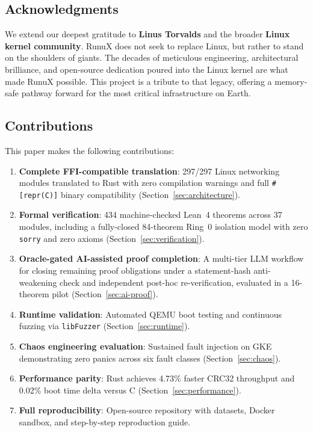 \documentclass[sigconf,nonacm=false]{acmart}
\begin{document}
\subsection{Acknowledgments}
We extend our deepest gratitude to \textbf{Linus Torvalds} and the broader \textbf{Linux kernel community}. RunuX does not seek to replace Linux, but rather to stand on the shoulders of giants. The decades of meticulous engineering, architectural brilliance, and open-source dedication poured into the Linux kernel are what made RunuX possible. This project is a tribute to that legacy, offering a memory-safe pathway forward for the most critical infrastructure on Earth.

\subsection{Contributions}
This paper makes the following contributions:
\begin{enumerate}
    \item \textbf{Complete FFI-compatible translation}: 297/297 Linux networking modules translated to Rust with zero compilation warnings and full \texttt{\#[repr(C)]} binary compatibility (Section~\ref{sec:architecture}).
    \item \textbf{Formal verification}: 434 machine-checked Lean~4 theorems across 37 modules, including a fully-closed 84-theorem Ring~0 isolation model with zero \texttt{sorry} and zero axioms (Section~\ref{sec:verification}).
    \item \textbf{Oracle-gated AI-assisted proof completion}: A multi-tier LLM workflow for closing remaining proof obligations under a statement-hash anti-weakening check and independent post-hoc re-verification, evaluated in a 16-theorem pilot (Section~\ref{sec:ai-proof}).
    \item \textbf{Runtime validation}: Automated QEMU boot testing and continuous fuzzing via \texttt{libFuzzer} (Section~\ref{sec:runtime}).
    \item \textbf{Chaos engineering evaluation}: Sustained fault injection on GKE demonstrating zero panics across six fault classes (Section~\ref{sec:chaos}).
    \item \textbf{Performance parity}: Rust achieves 4.73\% faster CRC32 throughput and 0.02\% boot time delta versus C (Section~\ref{sec:performance}).
    \item \textbf{Full reproducibility}: Open-source repository with datasets, Docker sandbox, and step-by-step reproduction guide.
\end{enumerate}
\end{document}
